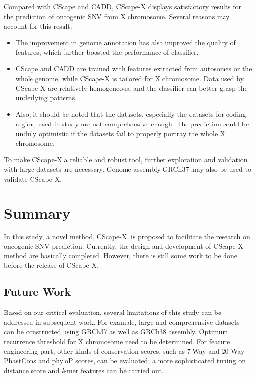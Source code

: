 \documentclass[a4paper,nohyper,nobib,openany,justified]{tufte-book}
\begin{document}
\begin{fullwidth}
Compared with CScape and CADD, CScape-X displays satisfactory results for the prediction of oncogenic SNV from X chromosome. Several reasons may account for this result:
\begin{itemize}
  \item The improvement in genome annotation has also improved the quality of features, which further boosted the performance of classifier.
  \item CScape and CADD are trained with features extracted from autosomes or the whole genome, while CScape-X is tailored for X chromosome. Data used by CScape-X are relatively homogeneous, and the classifier can better grasp the underlying patterns.
  \item Also, it should be noted that the datasets, especially the datasets for coding region, used in study are not comprehensive enough. The prediction could be unduly optimistic if the datasets fail to properly portray the whole X chromosome.
\end{itemize}

To make CScape-X a reliable and robust tool, further exploration and validation with large datasets are necessary. Genome assembly GRCh37 may also be used to validate CScape-X.

\clearpage
\chapter{Summary}

In this study, a novel method, CScape-X, is proposed to facilitate the research on oncogenic SNV prediction. Currently, the design and development of CScape-X method are basically completed. However, there is still some work to be done before the release of CScape-X.

\section{Future Work}

Based on our critical evaluation, several limitations of this study can be addressed in subsequent work. For example, large and comprehensive datasets can be constructed using GRCh37 as well as GRCh38 assembly. Optimum recurrence threshold for X chromosome need to be determined. For feature engineering part, other kinds of conservation scores, such as 7-Way and 20-Way PhastCons and phyloP scores, can be evaluated; a more sophisticated tuning on distance score and \emph{k}-mer features can be carried out.


\end{fullwidth}
\end{document}
